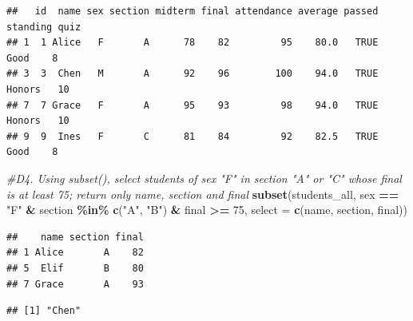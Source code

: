 \documentclass[
]{article}
\newenvironment{Shaded}{\begin{snugshade}}{\end{snugshade}}
\newcommand{\AttributeTok}[1]{\textcolor[rgb]{0.13,0.29,0.53}{#1}}
\newcommand{\CommentTok}[1]{\textcolor[rgb]{0.56,0.35,0.01}{\textit{#1}}}
\newcommand{\DecValTok}[1]{\textcolor[rgb]{0.00,0.00,0.81}{#1}}
\newcommand{\FunctionTok}[1]{\textcolor[rgb]{0.13,0.29,0.53}{\textbf{#1}}}
\newcommand{\NormalTok}[1]{#1}
\newcommand{\OtherTok}[1]{\textcolor[rgb]{0.56,0.35,0.01}{#1}}
\newcommand{\SpecialCharTok}[1]{\textcolor[rgb]{0.81,0.36,0.00}{\textbf{#1}}}
\newcommand{\StringTok}[1]{\textcolor[rgb]{0.31,0.60,0.02}{#1}}
\begin{document}
\begin{verbatim}
##   id  name sex section midterm final attendance average passed standing quiz
## 1  1 Alice   F       A      78    82         95    80.0   TRUE     Good    8
## 3  3  Chen   M       A      92    96        100    94.0   TRUE   Honors   10
## 7  7 Grace   F       A      95    93         98    94.0   TRUE   Honors   10
## 9  9  Ines   F       C      81    84         92    82.5   TRUE     Good    8
\end{verbatim}

\begin{Shaded}
\begin{Highlighting}[]
\CommentTok{\#D4. Using subset(), select students of sex "F" in section "A" or "C" whose final is at least 75; return only name, section and final}
\FunctionTok{subset}\NormalTok{(students\_all, sex }\SpecialCharTok{==} \StringTok{"F"} \SpecialCharTok{\&}\NormalTok{ section }\SpecialCharTok{\%in\%} \FunctionTok{c}\NormalTok{(}\StringTok{"A"}\NormalTok{, }\StringTok{"B"}\NormalTok{) }\SpecialCharTok{\&}\NormalTok{ final }\SpecialCharTok{\textgreater{}=} \DecValTok{75}\NormalTok{, }\AttributeTok{select =} \FunctionTok{c}\NormalTok{(name, section, final))}
\end{Highlighting}
\end{Shaded}

\begin{verbatim}
##    name section final
## 1 Alice       A    82
## 5  Elif       B    80
## 7 Grace       A    93
\end{verbatim}

\begin{Shaded}
\end{Shaded}

\begin{verbatim}
## [1] "Chen"
\end{verbatim}
\end{document}
